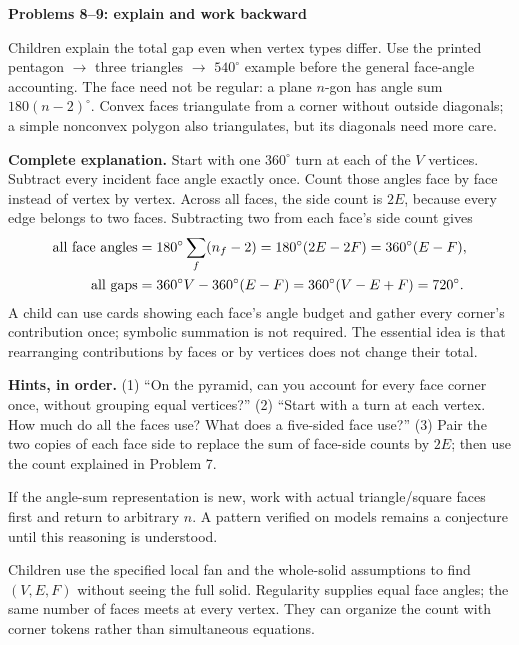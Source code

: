 \documentclass[11pt,letterpaper]{article}
\newcommand{\titleline}[1]{\par{\Large\bfseries #1}\par\vspace{4pt}}
\newcommand{\sub}[1]{\par\vspace{3pt}{\bfseries #1}\par}
\newcommand{\hints}[3]{\textbf{Hints, in order.} (1) #1 (2) #2 (3) #3\par}
\newcommand{\degc}{^{\circ}}
\begin{document}
\newpage
\titleline{Problems 8--9: explain and work backward}
\sub{Problem 8 / student p.8 / deeper continuation}
Children explain the total gap even when vertex types differ. Use the printed pentagon $\rightarrow$ three triangles $\rightarrow$ $540\degc$ example before the general face-angle accounting. The face need not be regular: a plane $n$-gon has angle sum $180(n-2)\degc$. Convex faces triangulate from a corner without outside diagonals; a simple nonconvex polygon also triangulates, but its diagonals need more care.

\textbf{Complete explanation.} Start with one $360\degc$ turn at each of the $V$ vertices. Subtract every incident face angle exactly once. Count those angles face by face instead of vertex by vertex. Across all faces, the side count is $2E$, because every edge belongs to two faces. Subtracting two from each face's side count gives
\[
\begin{aligned}
\hbox{all face angles}&=180\degc\sum_{f}(n_f-2)
 =180\degc(2E-2F)=360\degc(E-F),\\
\hbox{all gaps}&=360\degc V-360\degc(E-F)
 =360\degc(V-E+F)=720\degc.
\end{aligned}
\]
A child can use cards showing each face's angle budget and gather every corner's contribution once; symbolic summation is not required. The essential idea is that rearranging contributions by faces or by vertices does not change their total.

\hints{``On the pyramid, can you account for every face corner once, without grouping equal vertices?''}{``Start with a turn at each vertex. How much do all the faces use? What does a five-sided face use?''}{Pair the two copies of each face side to replace the sum of face-side counts by $2E$; then use the count explained in Problem 7.}
If the angle-sum representation is new, work with actual triangle/square faces first and return to arbitrary $n$. A pattern verified on models remains a conjecture until this reasoning is understood.

\sub{Problem 9 / student p.9 / reverse inventory}
Children use the specified local fan and the whole-solid assumptions to find $(V,E,F)$ without seeing the full solid. Regularity supplies equal face angles; the same number of faces meets at every vertex. They can organize the count with corner tokens rather than simultaneous equations.
\end{document}
